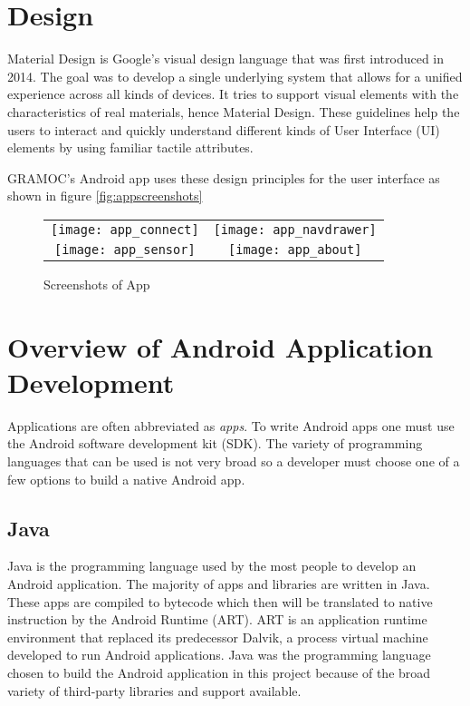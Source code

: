 \section{Design}
Material Design is Google's visual design language that was first introduced in 2014. The goal was to develop a single underlying system that allows for a unified experience across all kinds of devices. It tries to support visual elements with the characteristics of real materials, hence Material Design. These guidelines help the users to interact and quickly understand different kinds of User Interface (UI) elements by using familiar tactile attributes.

GRAMOC's Android app uses these design principles for the user interface as shown in figure \vref{fig:appscreenshots}

\begin{figure}[H]
    \centering
    \begin{tabular}{cc}
    \texttt{[image: app\_connect]}
    &
    \texttt{[image: app\_navdrawer]}
    \\
    \texttt{[image: app\_sensor]}
    &
    \texttt{[image: app\_about]}
    \end{tabular}
    \caption{Screenshots of App}
    \label{fig:appscreenshots}
\end{figure}

\section{Overview of Android Application Development}
Applications are often abbreviated as \textit{apps}. To write Android apps one must use the Android software development kit (SDK). The variety of programming languages that can be used is not very broad so a developer must choose one of a few options to build a native Android app.

\subsection{Java}
Java is the programming language used by the most people to develop an Android application. The majority of apps and libraries are written in Java. These apps are compiled to bytecode which then will be translated to native instruction by the Android Runtime (ART). ART is an application runtime environment that replaced its predecessor Dalvik, a process virtual machine developed to run Android applications. Java was the programming language chosen to build the Android application in this project because of the broad variety of third-party libraries and support available.

